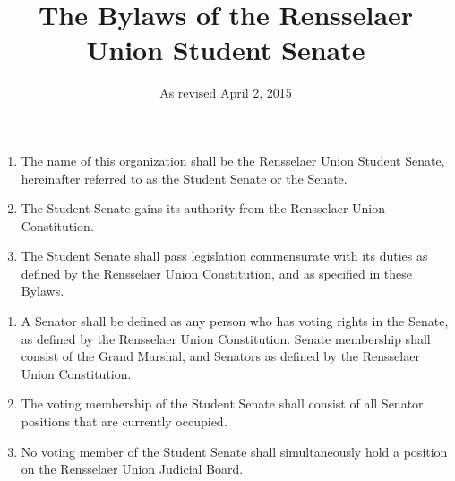 \documentclass{bylaws}
\title{The Bylaws of the Rensselaer Union Student Senate}
\author{As revised April 2, 2015}
\date{}
\begin{document}
\maketitle

\begin{enumerate}
\item The name of this organization shall be the Rensselaer Union Student Senate, hereinafter referred to as the Student Senate or the
Senate.
\item The Student Senate gains its authority from the Rensselaer Union Constitution.
\item The Student Senate shall pass legislation commensurate with its duties as defined by the Rensselaer Union Constitution, and as
specified in these Bylaws.
\end{enumerate}


\begin{enumerate}
\item A Senator shall be defined as any person who has voting rights in the Senate, as defined by the Rensselaer Union Constitution.
Senate membership shall consist of the Grand Marshal, and Senators as defined by the Rensselaer Union Constitution.
\item The voting membership of the Student Senate shall consist of all Senator positions that are currently occupied.
\item No voting member of the Student Senate shall simultaneously hold a position on the Rensselaer Union Judicial Board.
\end{enumerate}
\end{document}
